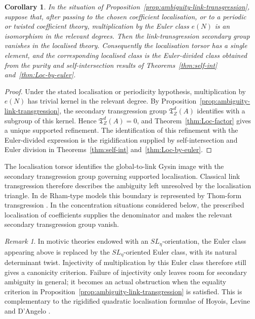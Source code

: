 \documentclass[10pt,a4paper,dvipsnames,x11names]{amsart}
\newcommand{\TLoc}{\mathfrak T}
\numberwithin{equation}{section}
\theoremstyle{plain}
\newtheorem{corollary}[corollary]{Corollary}
\theoremstyle{definition}
\theoremstyle{remark}
\newtheorem{remark}[remark]{Remark}
\begin{document}
\begin{corollary}\label{cor:euler-inversion-rigidification}
In the situation of Proposition~\ref{prop:ambiguity-link-transgression}, suppose that, after passing to the chosen coefficient localisation, or to a periodic or twisted coefficient theory, multiplication by the Euler class \(e(N)\) is an isomorphism in the relevant degrees.  Then the link-transgression secondary group vanishes in the localised theory.  Consequently the localisation torsor has a single element, and the corresponding localised class is the Euler-divided class obtained from the purity and self-intersection results of Theorems~\ref{thm:self-int} and~\ref{thm:Loc-by-euler}.
\end{corollary}

\begin{proof}
Under the stated localisation or periodicity hypothesis, multiplication by \(e(N)\) has trivial kernel in the relevant degree.  By Proposition~\ref{prop:ambiguity-link-transgression}, the secondary transgression group \(\TLoc_Z^d(A)\) identifies with a subgroup of this kernel.  Hence \(\TLoc_Z^d(A)=0\), and Theorem~\ref{thm:Loc-factor} gives a unique supported refinement.  The identification of this refinement with the Euler-divided expression is the rigidification supplied by self-intersection and Euler division in Theorems~\ref{thm:self-int} and~\ref{thm:Loc-by-euler}.
\end{proof}

The localisation torsor identifies the global-to-link Gysin image with the secondary transgression group governing supported localisation. Classical link transgression therefore describes the ambiguity left unresolved by the localisation triangle.  In de Rham-type models this boundary is represented by Thom-form transgression \cite{MathaiQuillen,BottTu}.  In the concentration situations considered below, the prescribed localisation of coefficients supplies the denominator and makes the relevant secondary transgression group vanish.

\begin{remark}\label{rem:quadratic-canonicity-obstruction}
In motivic theories endowed with an \(SL_{\eta}\)-orientation, the Euler class appearing above is replaced by the \(SL_{\eta}\)-oriented Euler class, with its natural determinant twist.  Injectivity of multiplication by this Euler class therefore still gives a canonicity criterion.  Failure of injectivity only leaves room for secondary ambiguity in general; it becomes an actual obstruction when the equality criterion in Proposition~\ref{prop:ambiguity-link-transgression} is satisfied.  This is complementary to the rigidified quadratic localisation formulae of Hoyois, Levine and D'Angelo \cite{HoyoisTrace,LevineWitt,DAngeloSLeta}.
\end{remark}
\end{document}
